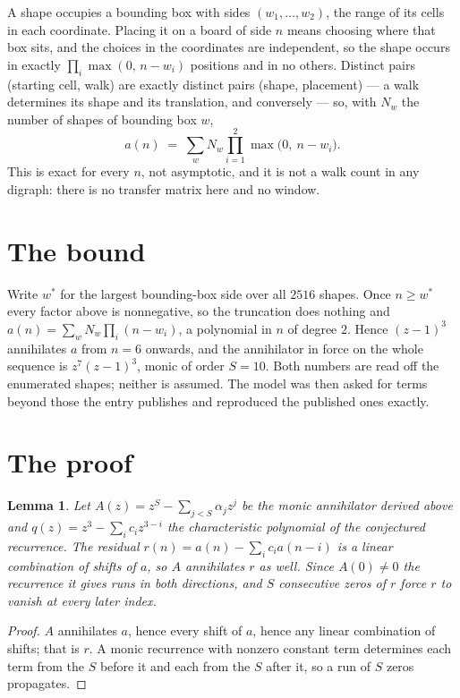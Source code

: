 \documentclass[11pt,a4paper]{article}
\theoremstyle{plain}
\newtheorem{lemma}[theorem]{Lemma}
\theoremstyle{definition}
\begin{document}
A shape occupies a bounding box with sides $(w_1,\dots,w_{2})$, the range of its cells in each
coordinate. Placing it on a board of side $n$ means choosing where that box sits, and the
choices in the coordinates are independent, so the shape occurs in exactly
$\prod_{i}\max(0,\,n-w_i)$ positions and in no others. Distinct pairs (starting cell,
walk) are exactly distinct pairs (shape, placement) --- a walk determines its shape and its
translation, and conversely --- so, with $N_w$ the number of shapes of bounding box $w$,
\[
a(n)\;=\;\sum_{w} N_w \prod_{i=1}^{2}\max\bigl(0,\ n-w_i\bigr).
\]
This is exact for every $n$, not asymptotic, and it is not a walk count in any digraph: there is
no transfer matrix here and no window.

\section{The bound}

Write $w^\ast$ for the largest bounding-box side over all $2516$ shapes. Once $n\ge w^\ast$
every factor above is nonnegative, so the truncation does nothing and
$a(n)=\sum_w N_w\prod_i(n-w_i)$, a polynomial in $n$ of degree $2$. Hence $(z-1)^{3}$
annihilates $a$ from $n=6$ onwards, and the annihilator in force on the whole sequence is
$z^{7}(z-1)^{3}$, monic of order $S=10$. Both numbers are read off the enumerated
shapes; neither is assumed. The model was then asked for terms beyond those the entry publishes
and reproduced the published ones exactly.

\section{The proof}

\begin{lemma}\label{lem:crit}
Let $A(z)=z^S-\sum_{j<S}\alpha_jz^{j}$ be the monic annihilator derived above and
$q(z)=z^{3}-\sum_ic_iz^{3-i}$ the characteristic polynomial of the conjectured
recurrence. The residual $r(n)=a(n)-\sum_ic_ia(n-i)$ is a linear combination of shifts of $a$,
so $A$ annihilates $r$ as well. Since $A(0)\ne0$ the recurrence it gives runs in both
directions, and $S$ consecutive zeros of $r$ force $r$ to vanish at every later index.
\end{lemma}

\begin{proof}
$A$ annihilates $a$, hence every shift of $a$, hence any linear combination of shifts; that is
$r$. A monic recurrence with nonzero constant term determines each term from the $S$ before it
and each from the $S$ after it, so a run of $S$ zeros propagates.
\end{proof}
\end{document}
